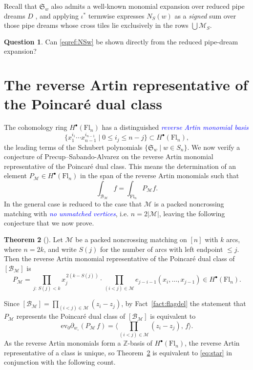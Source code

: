 \documentclass[11pt]{amsart}
\theoremstyle{definition}
\newtheorem{thm}{Theorem}[section]
\newtheorem{question}[thm]{Question}
\numberwithin{equation}{section}
\newcommand{\suchthat}{\;|\;}
\newcommand{\schub}[1]{\mathfrak{S}_{#1}} %
\newcommand{\ct}{\operatorname{ev_0}} %
\newcommand{\fl}[1]{\mathrm{Fl}_{#1}}
\renewcommand\emph[1]{\textcolor{blue}{\textit{#1}}} %
\newcommand{\XM}{\mathcal{B}_{\mathcal{M}}}
\begin{document}
Recall that $\schub{w}$ also admits a well-known monomial expansion
 over reduced pipe dreams $D$ \cite{BJS93}, and applying
$\iota^*$ termwise expresses $N_S(w)$ as a \textit{signed} sum over those
pipe dreams whose cross tiles lie exclusively in the rows $\bigcup\mathcal{M}_S$.
\begin{question}
   Can \eqref{eqref:NSw} be shown directly from the reduced pipe-dream expansion?
\end{question}

\section{The reverse Artin representative of the  Poincar\'e dual class}

The cohomology ring $H^\bullet(\fl{n})$ has a distinguished \emph{reverse Artin monomial basis}
$$\{x_1^{i_1}\cdots x_{n-1}^{i_{n-1}}\suchthat 0\le i_j\le n-j\}\subset H^\bullet(\fl{n}),$$
the leading terms of the Schubert polynomials $\{\schub{w}\suchthat w\in S_n\}$.
We now verify a conjecture of Precup--Sabando-Alvarez \cite[Conjecture 1]{sabandoalvarez2026idealsdefiningcomponentstworow} on the reverse Artin monomial representative of the Poincar\'e dual class. This means the determination of an element $P_{\mathcal{M}}\in H^\bullet(\fl{n})$ in the span of the reverse Artin monomials such that
$$\int_{\XM}f=\int_{\fl{n}}P_{\mathcal{M}}f.$$
In \cite[Lemma 7.12]{sabandoalvarez2026idealsdefiningcomponentstworow} the general case is reduced to the case that $\mathcal{M}$ is a packed noncrossing matching with \emph{no unmatched vertices}, i.e. $n=2|\mathcal{M}|$, leaving the following conjecture that we now prove.
\begin{thm}[{\cite[Conjecture~1]{sabandoalvarez2026idealsdefiningcomponentstworow}}]\label{thm:conj1}
Let $\mathcal{M}$ be a packed
noncrossing  matching on $[n]$ with $k$ arcs,  where $n=2k$, and write $S(j)$ for the number of
arcs with left endpoint $\le j$. Then
the reverse Artin monomial representative of the Poincar\'e dual class of $[\XM]$ is
\[
  P_{\mathcal{M}}=\prod_{j:\,S(j)<k}x_j^{\,2(k-S(j))}
  \cdot\prod_{(i<j)\in \mathcal{M}}e_{j-i-1}(x_i,\dots,x_{j-1})\in H^\bullet(\fl{n}).
\]
\end{thm}
Since
$[\mathcal{B}_{\mathcal{M}}]=\prod_{(i<j)\in \mathcal{M}}(z_i-z_j)$, by Fact~\ref{fact:flagdel} the statement that $P_{\mathcal{M}}$ represents the Poincar\'e dual class of $[\mathcal{B}_{\mathcal{M}}]$
is equivalent to
\begin{equation}\label{eq:star}
  \ct\partial_{w_{\circ}}(P_{\mathcal{M}}\,f)=\big\langle\prod_{(i<j)\in \mathcal{M}}(z_i-z_j),\,f\big\rangle.
  \tag{$\star$}
\end{equation}
As the reverse Artin monomials form a $\mathbb{Z}$-basis of $H^\bullet(\fl{n})$, the reverse Artin representative of a class is unique, so Theorem~\ref{thm:conj1} is equivalent to \eqref{eq:star} in conjunction with the following count.
\end{document}
